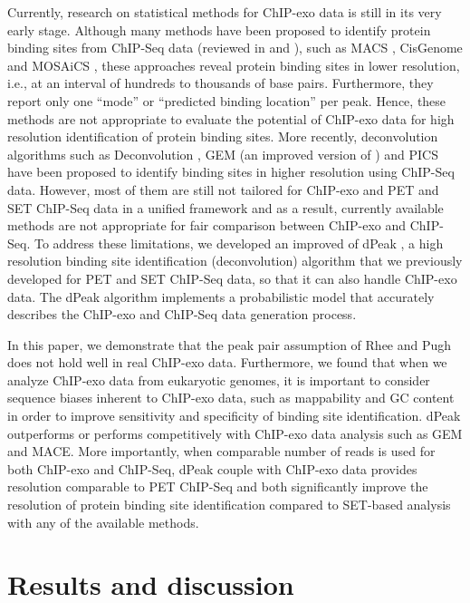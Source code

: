 \documentclass{bmcart}\usepackage[]{graphicx}\usepackage[]{color}
\begin{document}
Currently, research on statistical methods for ChIP-exo data is still
in its very early stage. Although many methods have been proposed to
identify protein binding sites from ChIP-Seq data (reviewed in
\cite{evaluation} and \cite{computation}), such as MACS \cite{macs},
CisGenome \cite{cisgenome} and MOSAiCS \cite{mosaics}, these
approaches reveal protein binding sites in lower resolution, i.e., at
an interval of hundreds to thousands of base pairs. Furthermore, they
report only one ``mode'' or ``predicted binding location'' per
peak. Hence, these methods are not appropriate to evaluate the
potential of ChIP-exo data for high resolution identification of
protein binding sites. More recently, deconvolution algorithms such as
Deconvolution \cite{csdeconv}, GEM \cite{gem} (an improved version of
\cite{gps}) and PICS \cite{pics} have been proposed to identify
binding sites in higher resolution using ChIP-Seq data. However, most
of them are still not tailored for ChIP-exo and PET and SET ChIP-Seq
data in a unified framework and as a result, currently available
methods are not appropriate for fair comparison between ChIP-exo and
ChIP-Seq. To address these limitations, we developed an improved of
dPeak \cite{dpeak}, a high resolution binding site identification
(deconvolution) algorithm that we previously developed for PET and SET
ChIP-Seq data, so that it can also handle ChIP-exo data. The dPeak
algorithm implements a probabilistic model that accurately describes
the ChIP-exo and ChIP-Seq data generation process.

In this paper, we demonstrate that the peak pair assumption of Rhee
and Pugh \cite{exo1} does not hold well in real ChIP-exo
data. Furthermore, we found that when we analyze ChIP-exo data from
eukaryotic genomes, it is important to consider sequence biases
inherent to ChIP-exo data, such as mappability and GC content in order
to improve sensitivity and specificity of binding site
identification. dPeak outperforms or performs competitively with
ChIP-exo data analysis such as GEM and MACE. More importantly, when
comparable number of reads is used for both ChIP-exo and ChIP-Seq,
dPeak couple with ChIP-exo data provides resolution comparable to PET
ChIP-Seq and both significantly improve the resolution of protein
binding site identification compared to SET-based analysis with any of
the available methods.

\newpage

\section{Results and discussion}
\label{sec:results}
\end{document}
